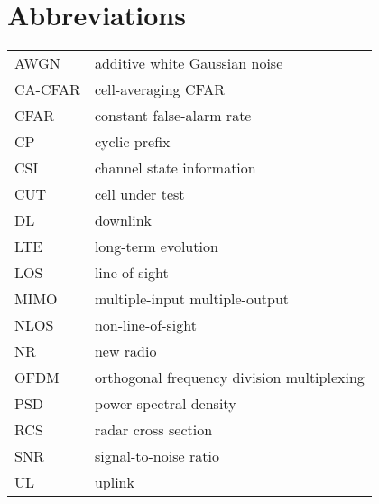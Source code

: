 \chapter*{Abbreviations} %

\begin{table}[H]
    \begin{tabular}{ll}
    	AWGN & additive white Gaussian noise \\[2px]
    	CA-CFAR & cell-averaging CFAR \\[2px]
    	CFAR & constant false-alarm rate \\[2px]
    	CP & cyclic prefix \\[2px]
    	CSI & channel state information \\[2px]
    	CUT & cell under test \\[2px]
    	DL & downlink \\[2px]
        LTE & long-term evolution \\[2px]
        LOS & line-of-sight \\[2px]
        MIMO & multiple-input multiple-output \\[2px]
        NLOS & non-line-of-sight \\[2px]
        NR & new radio\\[2px]
        OFDM & orthogonal frequency division multiplexing \\[2px]
        PSD & power spectral density  \\[2px]
        RCS & radar cross section \\[2px]
        SNR & signal-to-noise ratio \\[2px]
        UL & uplink \\[2px]
        
        
    \end{tabular}
\end{table}